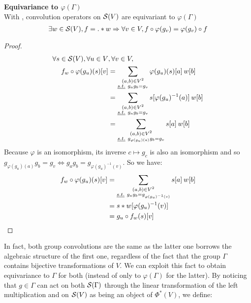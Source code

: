 \begin{proposition}\textbf{Equivariance to $\varphi(\Gamma)$}\\
With , convolution operators on $\cs(V)$ are equivariant to $\varphi(\Gamma)$ \ie
\begin{gather*}
\exists w \in \cs(V), f = . \ast w \Rightarrow \forall v \in V, f \circ \varphi(g_v) = \varphi(g_v) \circ f
\end{gather*}
\label{prop:equi}
\end{proposition}

\begin{proof}
\begin{align*}
\forall s \in \cs(V), \forall u \in V & ,\forall v \in V,\\
f_w \circ \varphi(g_u) (s) [v] & = \sum_{\substack{(a,b) \in V^2 \\ \st g_ag_b=g_v }} \varphi(g_u)(s)[a] \h{2} w[b]\\
& = \sum_{\substack{(a,b) \in V^2 \\ \st g_ag_b=g_v }} s[\varphi(g_u)^{-1}(a)] \h{2} w[b]\\
& = \sum_{\substack{(a,b) \in V^2 \\ \st g_{\varphi(g_u)(a)}g_b=g_v }} s[a] \h{2} w[b]\\
\end{align*}
Because $\varphi$ is an isomorphism, its inverse $c \mapsto g_c$ is also an isomorphism and so $g_{\varphi(g_u)(a)}g_b=g_v \Leftrightarrow g_{a}g_b=g_{\varphi(g_u)^{-1}(v)}$. So we have:
\begin{align*}
f_w \circ \varphi(g_u) (s) [v] & = \sum_{\substack{(a,b) \in V^2 \\ \st g_{a}g_b=g_{\varphi(g_u)^{-1}(v)} }} s[a] \h{2} w[b]\\
& = s \ast w [\varphi(g_u)^{-1}(v)]\\
& = g_u \circ f_w (s) [v]
\end{align*}
\end{proof}

In fact, both group convolutions are the same as the latter one borrows the algebraic structure of the first one, regardless of the fact that the group $\Gamma$ contains bijective transformations of $V$. We can exploit this fact to obtain equivariance to $\Gamma$ for both (instead of only to $\varphi(\Gamma)$ for the latter). By noticing that $g \in \Gamma$ can act on both $\cs(\Gamma)$ through the linear transformation of the left multiplication and on $\cs(V)$ as being an object of $\Phi^{*}(V)$, we define:

